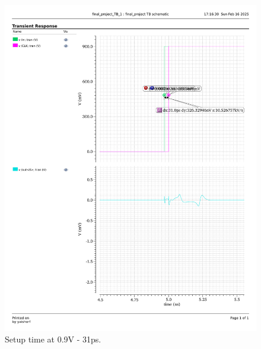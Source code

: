 \documentclass[a4paper,12pt]{article}
\begin{document}
\begin{figure}[H]
    \centering
    \begin{minipage}{0.49\textwidth}
        \centering
        \includegraphics[width=\textwidth]{graphs/setup_0.9_31p.pdf}
        \caption{Setup time at 0.9V - 31ps.}
    \end{minipage}
    \hfill
    \begin{minipage}{0.49\textwidth}
        \centering

\end{minipage}
\end{figure}
\end{document}
